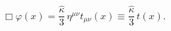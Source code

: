 \begin{equation}\label{h44t}
\Box\varphi(x) = \frac{\hat
\kappa}{3}\, \eta^{\mu\nu}t_{\mu\nu}(x)\equiv\frac{\hat \kappa}{3}\,
t(x).
\end{equation}

